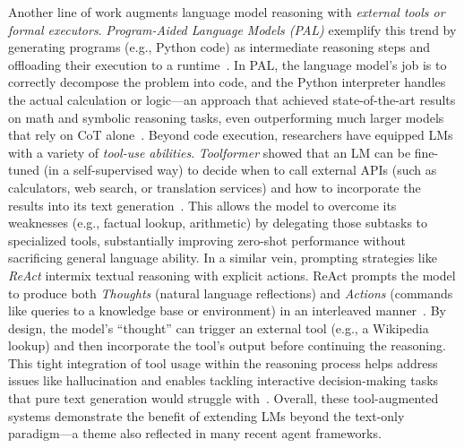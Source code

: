 \documentclass{article}
\theoremstyle{plain}
\theoremstyle{definition}
\theoremstyle{remark}
\begin{document}
Another line of work augments language model reasoning with \emph{external tools or formal executors}. \emph{Program-Aided Language Models (PAL)} exemplify this trend by generating programs (e.g., Python code) as intermediate reasoning steps and offloading their execution to a runtime~\cite{gao2023pal}. In PAL, the language model’s job is to correctly decompose the problem into code, and the Python interpreter handles the actual calculation or logic—an approach that achieved state-of-the-art results on math and symbolic reasoning tasks, even outperforming much larger models that rely on CoT alone~\cite{gao2023pal}. Beyond code execution, researchers have equipped LMs with a variety of \emph{tool-use abilities}. \emph{Toolformer} showed that an LM can be fine-tuned (in a self-supervised way) to decide when to call external APIs (such as calculators, web search, or translation services) and how to incorporate the results into its text generation~\cite{schick2023toolformer}. This allows the model to overcome its weaknesses (e.g., factual lookup, arithmetic) by delegating those subtasks to specialized tools, substantially improving zero-shot performance without sacrificing general language ability. In a similar vein, prompting strategies like \emph{ReAct} intermix textual reasoning with explicit actions. ReAct prompts the model to produce both \emph{Thoughts} (natural language reflections) and \emph{Actions} (commands like queries to a knowledge base or environment) in an interleaved manner~\cite{yao2023react}. By design, the model’s ``thought'' can trigger an external tool (e.g., a Wikipedia lookup) and then incorporate the tool’s output before continuing the reasoning. This tight integration of tool usage within the reasoning process helps address issues like hallucination and enables tackling interactive decision-making tasks that pure text generation would struggle with~\cite{yao2023react}. Overall, these tool-augmented systems demonstrate the benefit of extending LMs beyond the text-only paradigm—a theme also reflected in many recent agent frameworks.
\end{document}
